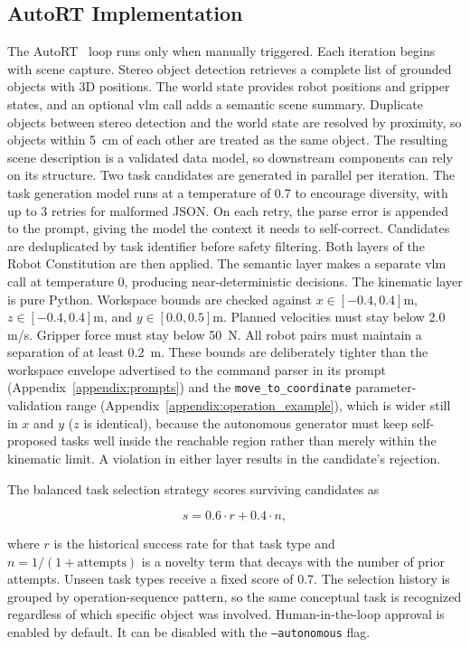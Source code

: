 \subsection{AutoRT Implementation}
The AutoRT~\cite{ahn2024autortembodiedfoundationmodels} loop runs only when manually triggered. Each iteration begins with scene capture. Stereo object detection retrieves a complete list of grounded objects with 3D positions. The world state provides robot positions and gripper states, and an optional \gls{vlm} call adds a semantic scene summary. Duplicate objects between stereo detection and the world state are resolved by proximity, so objects within 5~cm of each other are treated as the same object. The resulting scene description is a validated data model, so downstream components can rely on its structure.
Two task candidates are generated in parallel per iteration. The task generation model runs at a temperature of 0.7 to encourage diversity, with up to 3 retries for malformed JSON. On each retry, the parse error is appended to the prompt, giving the model the context it needs to self-correct. Candidates are deduplicated by task identifier before safety filtering. Both layers of the Robot Constitution are then applied. The semantic layer makes a separate \gls{vlm} call at temperature 0, producing near-deterministic decisions. The kinematic layer is pure Python. Workspace bounds are checked against $x \in [-0.4, 0.4]$m, $z \in [-0.4, 0.4]$m, and $y \in [0.0, 0.5]$m. Planned velocities must stay below 2.0 m/s. Gripper force must stay below 50~N. All robot pairs must maintain a separation of at least 0.2~m. These bounds are deliberately tighter than the workspace envelope advertised to the command parser in its prompt (Appendix~\ref{appendix:prompts}) and the \texttt{move\_to\_coordinate} parameter-validation range (Appendix~\ref{appendix:operation_example}), which is wider still in $x$ and $y$ ($z$ is identical), because the autonomous generator must keep self-proposed tasks well inside the reachable region rather than merely within the kinematic limit. A violation in either layer results in the candidate’s rejection.

The balanced task selection strategy scores surviving candidates as

\begin{equation}
	s = 0.6 \cdot r + 0.4 \cdot n,
\end{equation}

where $r$ is the historical success rate for that task type and $n = 1/(1 + \text{attempts})$ is a novelty term that decays with the number of prior attempts. Unseen task types receive a fixed score of 0.7. The selection history is grouped by operation-sequence pattern, so the same conceptual task is recognized regardless of which specific object was involved. Human-in-the-loop approval is enabled by default. It can be disabled with the \texttt{--autonomous} flag.

